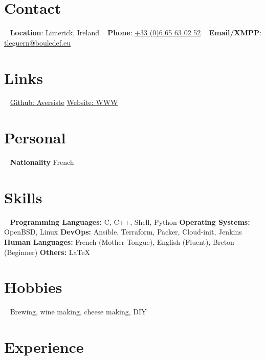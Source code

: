 \documentclass[]{friggeri-cv} %
\begin{document}


\begin{aside} %
\section{Contact}
~
\textbf{Location}: Limerick, Ireland
~
\textbf{Phone}: \href{tel:0033665630252}{\underline{+33 (0)6 65 63 02 52}}
~
\textbf{Email/XMPP}: \href{mailto:tleguern@bouledef.eu}{\underline{tleguern@bouledef.eu}}
\section {Links}
~
\href{https://github.com/Aversiste}{Github: \underline{Aversiste}}
\href{https://www.bouledef.eu/~tleguern}{Website: \underline{WWW}}
\section{Personal}
~
\textbf{Nationality}
French
\section{Skills}
~
\textbf{Programming Languages:} C, C++, Shell, Python
\textbf{Operating Systems:} OpenBSD, Linux
\textbf{DevOps:} Ansible, Terraform, Packer, Cloud-init, Jenkins
\textbf{Human Languages:} French (Mother Tongue), English (Fluent), Breton (Beginner)
\textbf{Others:} \LaTeX
\section{Hobbies}
~
Brewing, wine making, cheese making, DIY
\end{aside}


\section{Experience}
\end{document}
